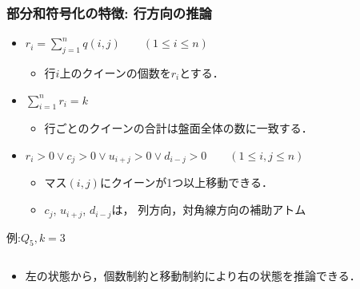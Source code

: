 \documentclass[dvipdfmx,10pt]{beamer}
\begin{document}
\begin{frame}\frametitle{部分和符号化の特徴: 行方向の推論}
  \begin{itemize}
   \item {}\quad $r_{i}=\sum\limits_{j=1}^{n} 
	      q(i,j) \qquad (1 \leq i \leq n)$ 
	 \begin{itemize}
	  \item 行$i$上のクイーンの個数を$r_i$とする．
	 \end{itemize}
   \item {}\quad $\sum\limits_{i=1}^{n}r_{i} = k$
	 \begin{itemize}
	  \item 行ごとのクイーンの合計は盤面全体の数に一致する．
	 \end{itemize}
   \item {}\quad $r_{i}>0 \vee c_{j}>0 \vee 
	 u_{i+j}>0 \vee d_{i-j} > 0  \qquad (1\leq i,j \leq n)$ 
	 \begin{itemize}
	  \item マス$(i,j)$にクイーンが1つ以上移動できる．
	  \item $c_{j}$, $u_{i+j}$, $d_{i-j}$は，
		列方向，対角線方向の補助アトム
	 \end{itemize}
  \end{itemize}
 \begin{exampleblock}{例:$Q_{5},k=3$}
  \begin{columns}
   \begin{column}{0.3\textwidth}
    \centering
    \scalebox{0.9}{
    
    }
   \end{column}
   \begin{column}{0.3\textwidth}
    \centering
    \scalebox{0.9}{
    
    }
   \end{column}
  \end{columns}
  \begin{itemize}
   \item 左の状態から，個数制約と移動制約により右の状態を推論できる．
  \end{itemize}
 \end{exampleblock}
\end{frame}
\end{document}
